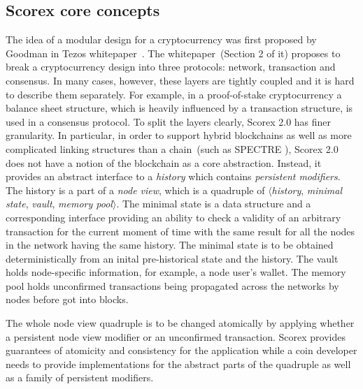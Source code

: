 
\subsection{Scorex core concepts}


The idea of a modular design for a cryptocurrency was first proposed by Goodman in Tezos whitepaper~\cite{goodmantezos}. The whitepaper~(Section 2 of it) proposes to break a cryptocurrency design into three protocols: network, transaction and consensus. In many cases, however, these layers are tightly coupled and it is hard to describe them separately. For example, in a proof-of-stake cryptocurrency a balance sheet structure, which is heavily influenced by a transaction structure, is used in a consensus protocol. To split the layers clearly, Scorex 2.0 has finer granularity. In particular, in order to support hybrid blockchains as well as more complicated linking structures than a chain~(such as SPECTRE\cite{EPRINT:SomLewZoh16}
), Scorex 2.0 does not have a notion of the blockchain as a core abstraction. Instead, it provides an abstract interface to a \textit{history} which contains \textit{persistent modifiers}. The history is a part of a \textit{node view}, which is a quadruple of $\langle$\textit{history}, \textit{minimal state}, \textit{vault}, \textit{memory pool}$\rangle$. The minimal state is a data structure and a corresponding interface providing an ability to check a validity of an arbitrary transaction for the current moment of time with the same result for all the nodes in the network having the same history. The minimal state is to be obtained deterministically from an inital pre-historical state and the history. The vault holds node-specific information, for example, a node user's wallet. The memory pool holds unconfirmed transactions being propagated across the networks by nodes before got into blocks. 

The whole node view quadruple is to be changed atomically by applying whether a persistent node view modifier or an unconfirmed transaction. Scorex provides guarantees of atomicity and consistency for the application while a coin developer needs to provide implementations for the abstract parts of the quadruple as well as a family of persistent modifiers.